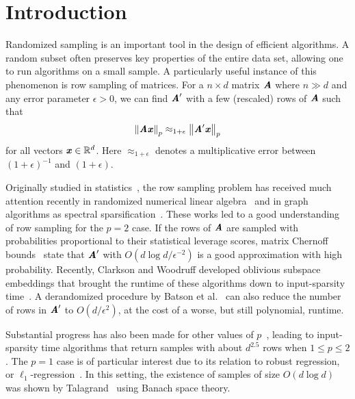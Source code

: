 
\section{Introduction}
\label{sec:intro}
Randomized sampling is an important tool in the design of efficient algorithms.
A random subset often preserves key properties of the entire data set,
allowing one to run algorithms on a small sample.
A particularly useful instance of this phenomenon is row sampling of matrices.
For a $n \times d$ matrix $\AA$ where $n \gg d$ and any error parameter
$\epsilon > 0$, we can find $\AA'$ with a few (rescaled) rows of $\AA$ such that
\begin{equation*}
\norm{\AA \xx}_{p} \approx_{1 + \epsilon} \norm{\AA' \xx}_{p}
\end{equation*}
for all vectors $\xx \in \Re^{d}$. Here $\approx_{1 + \epsilon}$
denotes a multiplicative error between $(1 + \epsilon)^{-1}$ and $(1 + \epsilon)$.

Originally studied in statistics~\cite{Talagrand90,RudelsonV07,Tropp12},
the row sampling problem has received much attention recently in randomized numerical linear
algebra~\cite{DrineasMM06,DrineasMMW11,ClarksonW13,MahoneyM13,NelsonN12,LiMP13,CohenLMMPS14:arxiv}
and in graph algorithms as spectral sparsification~\cite{SpielmanS08:journal,BatsonSS12,KoutisLP12}.
These works led to a good understanding of row sampling for the $p = 2$ case.
If the rows of $\AA$ are sampled with probabilities proportional to their
statistical leverage scores, matrix Chernoff bounds~\cite{AhlswedeW02,RudelsonV07,Tropp12}
state that $\AA'$ with $O(d \log{d} / \epsilon^{-2})$ is a good approximation with high probability. 
Recently, Clarkson and Woodruff developed oblivious subspace embeddings
that brought the runtime of these algorithms down to input-sparsity time~\cite{ClarksonW13}.
A derandomized procedure by Batson et al.~\cite{BatsonSS12} can also
reduce the number of rows in $\AA'$ to $O(d / \epsilon^2)$, at the cost of a worse,
but still polynomial, runtime.

Substantial progress has also been made for other values of $p$~\cite{DasguptaDHKM09,SohlerW11,ClarksonDMMMW13,MahoneyM13},
leading to input-sparsity time algorithms that return samples
with about $d^{2.5}$ rows when $1 \leq p \leq 2$.
The $p = 1$ case is of particular interest due to its relation
to robust regression, or $\ell_1$-regression~\cite{Candes06}.
In this setting, the existence of samples of size $O(d \log{d})$ was
shown by Talagrand~\cite{Talagrand90} using Banach space theory.

